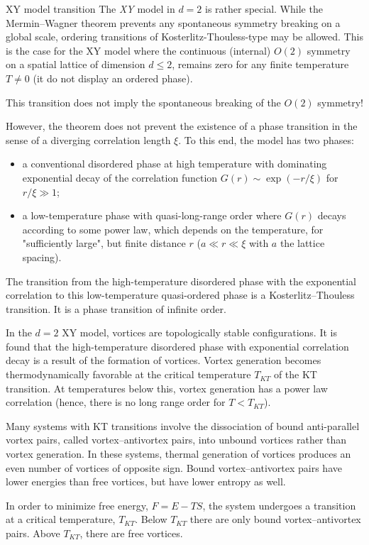 \documentclass[../main/main.tex]{subfiles}
\begin{document}
\begin{example}{XY model transition}{}
The \emph{XY} model in \( d=2 \) is rather special. While the Mermin–Wagner theorem prevents any spontaneous symmetry breaking on a global scale, ordering transitions of Kosterlitz-Thouless-type may be allowed.
 This is the case for the XY model where the continuous (internal) \( O(2) \) symmetry on a spatial lattice of dimension \(d \le 2\),  remains zero for any finite temperature \( T \neq 0 \) (it do not display an ordered phase).
\begin{remark}
This transition does not imply the spontaneous breaking of the \( O(2) \) symmetry!
\end{remark} 
However, the theorem does not prevent the existence of a phase transition in the sense of a diverging correlation length \(\xi\). To this end, the model has two phases: 
\begin{itemize}
    \item a conventional disordered phase at high temperature with dominating exponential decay of the correlation function 
\(G(r)\sim \exp(-r/\xi )\) for \(r/\xi \gg 1\);
\item a low-temperature phase with quasi-long-range order where \(G(r)\) decays according to some power law, which depends on the temperature, for "sufficiently large", but finite distance \(r\) (\(a \ll r \ll \xi\) with \(a\) the lattice spacing).
\end{itemize}

The transition from the high-temperature disordered phase with the exponential correlation to this low-temperature quasi-ordered phase is a Kosterlitz–Thouless transition. It is a phase transition of infinite order.

In the \(d=2\) XY model, vortices are topologically stable configurations. It is found that the high-temperature disordered phase with exponential correlation decay is a result of the formation of vortices. Vortex generation becomes thermodynamically favorable at the critical temperature \(T_{KT}\) of the KT transition. At temperatures below this, vortex generation has a power law correlation (hence, there is no long range order for \( T<T_{KT} \)).

Many systems with KT transitions involve the dissociation of bound anti-parallel vortex pairs, called vortex–antivortex pairs, into unbound vortices rather than vortex generation. In these systems, thermal generation of vortices produces an even number of vortices of opposite sign. Bound vortex–antivortex pairs have lower energies than free vortices, but have lower entropy as well.

In order to minimize free energy, \(F=E-TS\), the system undergoes a transition at a critical temperature, \(T_{KT}\).
Below \(T_{KT}\) there are only bound vortex–antivortex pairs. Above \(T_{KT}\), there are free vortices.

\end{example}
\end{document}

